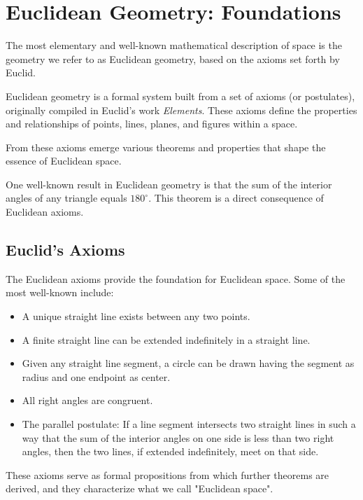 \documentclass[12pt,a4paper]{article}
\newenvironment{defbox}[1][]{%
  \begin{tcolorbox}[enhanced, breakable, colback=defcolor, colframe=green!50!black, title=#1, fonttitle=\bfseries, arc=3pt, boxrule=0.5pt]
}{\end{tcolorbox}}
\newenvironment{exbox}[1][]{%
  \begin{tcolorbox}[enhanced, breakable, colback=excolor, colframe=brown!50!black, title=#1, fonttitle=\bfseries, arc=3pt, boxrule=0.5pt]
}{\end{tcolorbox}}
\begin{document}
\section{Euclidean Geometry: Foundations}
The most elementary and well-known mathematical description of space is the geometry we refer to as Euclidean geometry, based on the axioms set forth by Euclid. 

\begin{defbox}[Euclidean Geometry]
Euclidean geometry is a formal system built from a set of axioms (or postulates), originally compiled in Euclid's work \textit{Elements}. These axioms define the properties and relationships of points, lines, planes, and figures within a space.
\end{defbox}

From these axioms emerge various theorems and properties that shape the essence of Euclidean space.

\begin{exbox}[Triangle Angle Sum Theorem]
One well-known result in Euclidean geometry is that the sum of the interior angles of any triangle equals $180^\circ$. This theorem is a direct consequence of Euclidean axioms.
\end{exbox}

\subsection{Euclid's Axioms}
The Euclidean axioms provide the foundation for Euclidean space. Some of the most well-known include:
\begin{itemize}
    \item A unique straight line exists between any two points.
    \item A finite straight line can be extended indefinitely in a straight line.
    \item Given any straight line segment, a circle can be drawn having the segment as radius and one endpoint as center.
    \item All right angles are congruent.
    \item The parallel postulate: If a line segment intersects two straight lines in such a way that the sum of the interior angles on one side is less than two right angles, then the two lines, if extended indefinitely, meet on that side.
\end{itemize}

These axioms serve as formal propositions from which further theorems are derived, and they characterize what we call "Euclidean space". 
\end{document}
